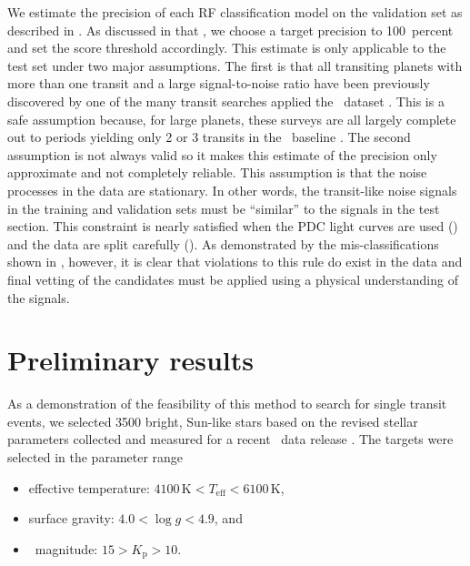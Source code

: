 We estimate the precision of each RF classification model on the validation
set as described in .
As discussed in that \sectionname, we choose a target precision to
100~percent and set the score threshold accordingly.
This estimate is only applicable to the test set under two major assumptions.
The first is that all transiting planets with more than one transit and a
large signal-to-noise ratio have been previously discovered by one of the many
transit searches applied the \kepler\ dataset \citep{Burke:2014}.
This is a safe assumption because, for large planets, these surveys are all
largely complete out to periods yielding only 2 or 3 transits in the \kepler\
baseline \citep[for example][]{Petigura:2013}.
The second assumption is not always valid so it makes this estimate of the
precision only approximate and not completely reliable.
This assumption is that the noise processes in the data are stationary.
In other words, the transit-like noise signals in the training and validation
sets must be ``similar'' to the signals in the test section.
This constraint is nearly satisfied when the PDC light curves are used
(\sect{data}) and the data are split carefully (\sect{split}).
As demonstrated by the mis-classifications shown in , however, it
is clear that violations to this rule do exist in the data and final vetting
of the candidates must be applied using a physical understanding of the
signals.


\section{Preliminary results}

As a demonstration of the feasibility of this method to search for single
transit events, we selected 3500 bright, Sun-like stars based on the revised
stellar parameters collected and measured for a recent \kepler\ data release
\citep{Huber:2014}.
The targets were selected in the parameter range
\begin{itemize}

\item effective temperature:
        $4100\,\mathrm{K} < T_\mathrm{eff} < 6100\,\mathrm{K}$,

\item surface gravity:  $4.0 < \log g < 4.9$, and

\item \kepler\ magnitude: $15 > K_\mathrm{p} > 10$.

\end{itemize}

